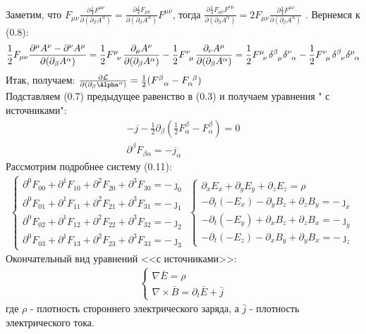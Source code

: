 \documentclass[__main__.tex]{subfiles}
\begin{document}
	Заметим, что 
	$F_{\mu\nu}\frac{\partial\frac{1}{4}F^{\mu\nu}}{\partial(\partial_\beta A^\alpha)}=\frac{\partial\frac{1}{4}F_{\mu\nu}}{\partial(\partial_\beta A^\alpha)}F^{\mu\nu}$, тогда $\frac{\partial\frac{1}{4}F_{\mu\nu}F^{\nu\mu}}{\partial(\partial_\beta A^\alpha)}=2F_{\mu\nu}\frac{\partial\frac{1}{4}F^{\mu\nu}}{\partial(\partial_\beta A^\alpha)}$
	. Вернемся к (0.8):\\
	\begin{gather}
		\frac{1}{2}F_{\mu\nu}\frac{\partial^\mu A^\nu-\partial^\nu A^\mu}{{\partial(\partial_\beta A^\alpha)}}=
		\frac{1}{2}F\indices{^{\mu}_\nu}\frac{\partial_\mu A^\nu}{{\partial(\partial_\beta A^\alpha)}}-\frac{1}{2}F\indices{^{\nu}_\mu}\frac{\partial_\nu A^\mu}{{\partial(\partial_\beta A^\alpha)}}=
		\frac{1}{2}\tensor{F}{^{\mu}_\nu}\tensor{\delta}{^{\beta}_\mu}\tensor{\delta}{^{\nu}_\alpha}-\frac{1}{2}\tensor{F}{^{\nu}_\mu}\tensor{\delta}{^{\beta}_\nu}\tensor{\delta}{^{\mu}_\alpha}
	\end{gather}
	Итак, получаем:
	$\frac{\partial \mathcal{L}}{\partial(\partial_\beta\Alpha^\alpha)}=
	\frac{1}{2}(F^\beta_{\ \ \alpha}-F_\alpha^{\ \beta})$
	\\
	Подставляем (0.7) предыдущее равенство в (0.3) и получаем уравнения " с источниками":\\
	\begin{gather}
		-j-\frac{1}{2}\partial_\beta(\frac{1}{2}F^\beta_\alpha-F_\alpha^\beta)=0\\
		\partial^\beta F_{\beta\alpha}=-j_\alpha
	\end{gather}
	Рассмотрим подробнее систему (0.11):\\
	\begin{gather}
		\begin{cases}
			\partial^0F_{00}+\partial^1F_{10}+\partial^2F_{20}+\partial^3F_{30}=-\jmath_0\\
			\partial^0F_{01}+\partial^1F_{11}+\partial^2F_{21}+\partial^3F_{31}=-\jmath_1\\
			\partial^0F_{02}+\partial^1F_{12}+\partial^2F_{22}+\partial^3F_{32}=-\jmath_2\\
			\partial^0F_{03}+\partial^1F_{13}+\partial^2F_{23}+\partial^3F_{33}=-\jmath_3
		\end{cases}
		\begin{cases}
			\partial_xE_x+\partial_yE_y+\partial_zE_z=\rho\\
			-\partial_t(-E_x)-\partial_yB_z+\partial_zB_y=-\jmath_x\\
			-\partial_t(-E_y)+\partial_xB_z+\partial_zB_x=-\jmath_y\\
			-\partial_t(-E_z)-\partial_xB_y+\partial_yB_x=-\jmath_z
		\end{cases}
	\end{gather}
	Окончательный вид уравнений <<с источниками>>:\\
	\begin{gather}
		\begin{cases}
			\nabla\bar{E}=\rho\\
			\nabla\times\bar{B}=\partial_t\bar{E}+\bar{j}
		\end{cases}
	\end{gather}
	где $\rho$ - плотность стороннего электрического заряда, а $\bar{j}$ - плотность электрического тока.
\end{document}
